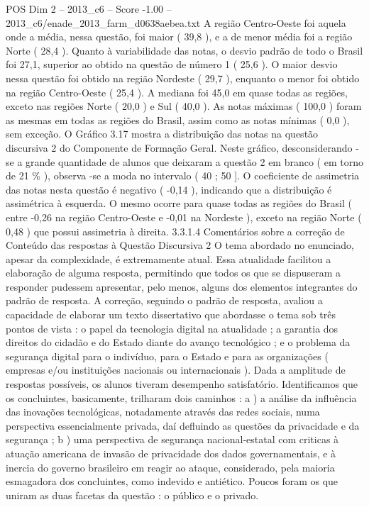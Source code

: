 \begin{textsample}{POS Dim 2 – 2013\_c6 – Score -1.00 – 2013\_c6/enade\_2013\_farm\_d0638aebea.txt}
A região Centro-Oeste foi aquela onde a média, nessa questão, foi maior ( 39,8 ), e a de menor média foi a região Norte ( 28,4 ).
Quanto à variabilidade das notas, o desvio padrão de todo o Brasil foi 27,1, superior ao obtido na questão de número 1 ( 25,6 ).
O maior desvio nessa questão foi obtido na região Nordeste ( 29,7 ), enquanto o menor foi obtido na região Centro-Oeste ( 25,4 ).
A mediana foi 45,0 em quase todas as regiões, exceto nas regiões Norte ( 20,0 ) e Sul ( 40,0 ).
As notas máximas ( 100,0 ) foram as mesmas em todas as regiões do Brasil, assim como as notas mínimas ( 0,0 ), sem exceção.
O Gráfico 3.17 mostra a distribuição das notas na questão discursiva 2 do Componente de Formação Geral.
Neste gráfico, desconsiderando -se a grande quantidade de alunos que deixaram a questão 2 em branco ( em torno de 21 \% ), observa -se a moda no intervalo ( 40 ; 50 ].
O coeficiente de assimetria das notas nesta questão é negativo ( -0,14 ), indicando que a distribuição é assimétrica à esquerda.
O mesmo ocorre para quase todas as regiões do Brasil ( entre -0,26 na região Centro-Oeste e -0,01 na Nordeste ), exceto na região Norte ( 0,48 ) que possui assimetria à direita. 3.3.1.4 Comentários sobre a correção de Conteúdo das respostas à Questão Discursiva 2 O tema abordado no enunciado, apesar da complexidade, é extremamente atual.
Essa atualidade facilitou a elaboração de alguma resposta, permitindo que todos os que se dispuseram a responder pudessem apresentar, pelo menos, alguns dos elementos integrantes do padrão de resposta.
A correção, seguindo o padrão de resposta, avaliou a capacidade de elaborar um texto dissertativo que abordasse o tema sob três pontos de vista : o papel da tecnologia digital na atualidade ; a garantia dos direitos do cidadão e do Estado diante do avanço tecnológico ; e o problema da segurança digital para o indivíduo, para o Estado e para as organizações ( empresas e/ou instituições nacionais ou internacionais ).
Dada a amplitude de respostas possíveis, os alunos tiveram desempenho satisfatório.
Identificamos que os concluintes, basicamente, trilharam dois caminhos : a ) a análise da influência das inovações tecnológicas, notadamente através das redes sociais, numa perspectiva essencialmente privada, daí defluindo as questões da privacidade e da segurança ; b ) uma perspectiva de segurança nacional-estatal com criticas à atuação americana de invasão de privacidade dos dados governamentais, e à inercia do governo brasileiro em reagir ao ataque, considerado, pela maioria esmagadora dos concluintes, como indevido e antiético.
Poucos foram os que uniram as duas facetas da questão : o público e o privado.

\end{textsample}
